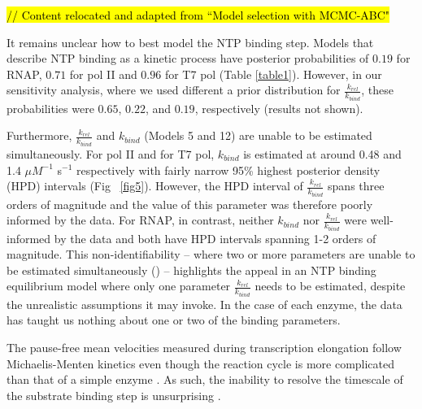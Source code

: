 \documentclass[10pt,letterpaper]{article}
\begin{document}
\hl{// Content relocated and adapted from ``Model selection with MCMC-ABC"}


It remains unclear how to best model the NTP binding step. Models that describe NTP binding as a kinetic process have posterior probabilities of $0.19$ for RNAP, $0.71$ for pol II and $0.96$ for T7 pol (Table \ref{table1}). However, in our sensitivity analysis, where we used different a prior distribution for $\frac{k_{rel}}{k_{bind}}$, these probabilities were $0.65$, $0.22$, and $0.19$, respectively (results not shown).


Furthermore, $\frac{k_{rel}}{k_{bind}}$ and $k_{bind}$ (Models 5 and 12) are unable to be estimated simultaneously. For pol II and for T7 pol, $k_{bind}$ is estimated at around 0.48 and 1.4 $\mu M^{-1}$ s$^{-1}$ respectively with fairly narrow 95\% highest posterior density (HPD) intervals (Fig ~\ref{fig5}). However, the HPD interval of $\frac{k_{rel}}{k_{bind}}$ spans three orders of magnitude and the value of this parameter was therefore poorly informed by the data. For RNAP, in contrast, neither $k_{bind}$ nor $\frac{k_{rel}}{k_{bind}}$ were well-informed by the data and both have HPD intervals spanning 1-2 orders of magnitude. This non-identifiability -- where two or more parameters are unable to be estimated simultaneously () -- highlights the appeal in an NTP binding equilibrium model where only one parameter $\frac{k_{rel}}{k_{bind}}$ needs to be estimated, despite the unrealistic assumptions it may invoke. In the case of each enzyme, the data has taught us nothing about one or two of the binding parameters.



The pause-free mean velocities measured during transcription elongation follow Michaelis-Menten kinetics
even though the reaction cycle is more complicated than that of a simple enzyme \cite{wong2018structural}. As such, the inability to resolve the timescale of the substrate binding step is unsurprising \cite{briggs1925note, english2006ever, schnell2014validity}.




\end{document}
